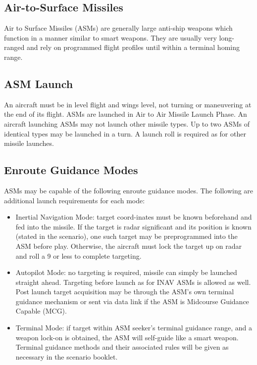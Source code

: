 \begin{advancedrules}

    \section{Air-to-Surface Missiles}
    \label{rule:asms}

    Air to Surface Missiles (ASMs) are generally large anti-ship weapons which function in a manner similar to smart weapons. They are usually very long-ranged and rely on programmed flight profiles until within a terminal homing range.

    \subsection{ASM Launch} An aircraft must be in level flight and wings level, not turning or maneuvering at the end of its flight. ASMs are launched in Air to Air Missile Launch Phase. An aircraft launching ASMs may not launch other missile types. Up to two ASMs of identical types may be launched in a turn. A launch roll is required as for other missile launches.

    \subsection{Enroute Guidance Modes} ASMs may be capable of the following enroute guidance modes. The following are additional launch requirements for each mode:

    \begin{itemize}
        \item Inertial Navigation Mode: target coord-inates must be known beforehand and fed into the missile. If the target is radar significant and its position is known (stated in the scenario), one such target may be preprogrammed into the ASM before play. Otherwise, the aircraft must lock the target up on radar and roll a 9 or less to complete targeting.

        \item Autopilot Mode: no targeting is required, missile can simply be launched straight ahead. Targeting before launch as for INAV ASMs is allowed as well. Post launch target acquisition may be through the ASM's own terminal guidance mechanism or sent via data link if the ASM is Midcourse Guidance Capable (MCG).

        \item Terminal Mode: if target within ASM seeker's terminal guidance range, and a weapon lock-on is obtained, the ASM will self-guide like a smart weapon. Terminal guidance methods and their associated rules will be given as necessary in the scenario booklet.


\end{itemize}
\end{advancedrules}
